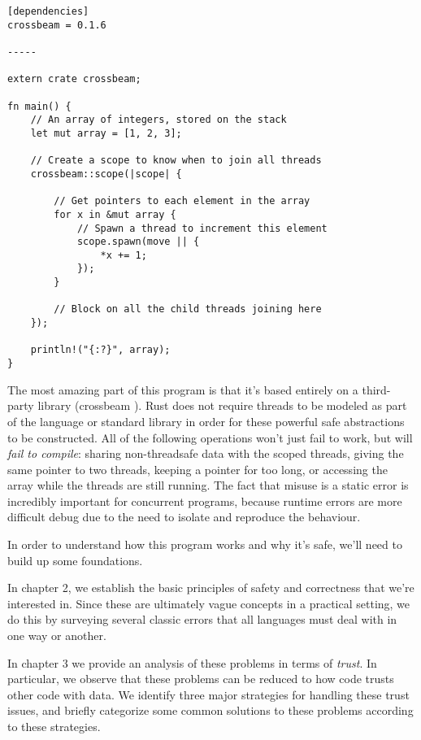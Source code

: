 \begin{verbatim}
[dependencies]
crossbeam = 0.1.6

-----

extern crate crossbeam;

fn main() {
    // An array of integers, stored on the stack
    let mut array = [1, 2, 3];

    // Create a scope to know when to join all threads
    crossbeam::scope(|scope| {

        // Get pointers to each element in the array
        for x in &mut array {
            // Spawn a thread to increment this element
            scope.spawn(move || {
                *x += 1;
            });
        }

        // Block on all the child threads joining here
    });

    println!("{:?}", array);
}
\end{verbatim}

The most amazing part of this program is that it's based entirely on a third-
party library (crossbeam \cite{crossbeam}). Rust does not require threads to be modeled as part
of the language or standard library in order for these powerful safe
abstractions to be constructed. All of the following operations won't just fail
to work, but will \emph{fail to compile}: sharing non-threadsafe data with
the scoped threads, giving the same pointer to two threads, keeping a pointer for too
long, or accessing the array while the threads are still running. The fact that
misuse is a static error is incredibly important for concurrent programs, because
runtime errors are more difficult debug due to the need to isolate and reproduce
the behaviour.

In order to understand how this program works and why it's safe, we'll need to
build up some foundations.

In chapter 2, we establish the basic principles of
safety and correctness that we're interested in. Since these are ultimately
vague concepts in a practical setting, we do this by surveying several classic
errors that all languages must deal with in one way or another.

In chapter 3 we provide an analysis of these problems in terms of \emph{trust}.
In particular, we observe that these problems can be reduced to how code trusts
other code with data. We identify three major strategies for handling
these trust issues, and briefly categorize some common solutions to these problems
according to these strategies.

